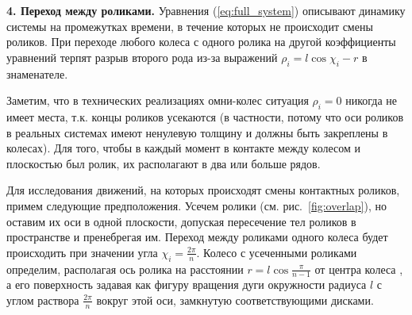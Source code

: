 {\bf 4. Переход между роликами.}
Уравнения (\ref{eq:full_system}) описывают динамику системы на промежутках времени, в течение которых не происходит смены роликов. 
При переходе любого колеса с одного ролика на другой коэффициенты уравнений терпят разрыв второго рода из-за выражений $\rho_i = l\cos\chi_i-r$ в знаменателе.


Заметим, что в технических реализациях омни-колес ситуация $\rho_i = 0$ никогда не имеет места, т.к. концы роликов усекаются (в частности, потому что оси роликов в реальных системах имеют ненулевую толщину и должны быть закреплены в колесах). Для того, чтобы в каждый момент в контакте между колесом и плоскостью был ролик, их располагают в два или больше рядов. %

Для исследования движений, на которых происходят смены контактных роликов, примем следующие предположения. Усечем ролики (см. рис.~\ref{fig:overlap}), но оставим их оси в одной плоскости, допуская пересечение тел роликов в пространстве и пренебрегая им. Переход между роликами одного колеса будет происходить при значении угла $\chi_i = \frac{2\pi}{n}$. Колесо с усеченными роликами определим, располагая ось ролика на расстоянии $r = l\cos\frac{\pi}{n-1}$ от центра колеса
, а его поверхность задавая как фигуру вращения дуги окружности радиуса $l$ с углом раствора $\frac{2\pi}{n}$ вокруг этой оси, замкнутую соответствующими дисками.

